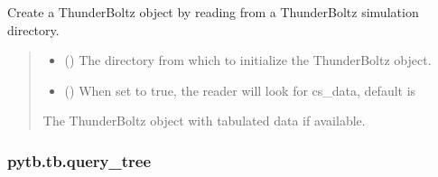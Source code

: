 \documentclass[letterpaper,10pt,english,openany,oneside]{sphinxmanual}
\begin{document}
\begin{fulllineitems}
\label{\detokenize{api/pytb.tb.read:pytb.tb.read}}
\pysigstartsignatures
{}
\pysigstopsignatures
\sphinxAtStartPar
Create a ThunderBoltz object by reading from a
ThunderBoltz simulation directory.
\begin{quote}\begin{description}
\begin{itemize}
\item {} 
\sphinxAtStartPar
{} () \textendash{} The directory from which to
initialize the ThunderBoltz object.

\item {} 
\sphinxAtStartPar
{} () \textendash{} When set to true, the reader will look for cs\_data,
default is 

\end{itemize}

\sphinxAtStartPar
The ThunderBoltz object with
tabulated data if available.

\sphinxAtStartPar
{\hyperref[\detokenize{api/pytb.ThunderBoltz:pytb.ThunderBoltz}]{}}

\end{description}\end{quote}

\end{fulllineitems}


\sphinxstepscope


\subsubsection{pytb.tb.query\_tree}
\label{\detokenize{api/pytb.tb.query_tree:pytb-tb-query-tree}}\label{\detokenize{api/pytb.tb.query_tree::doc}}
\end{document}
